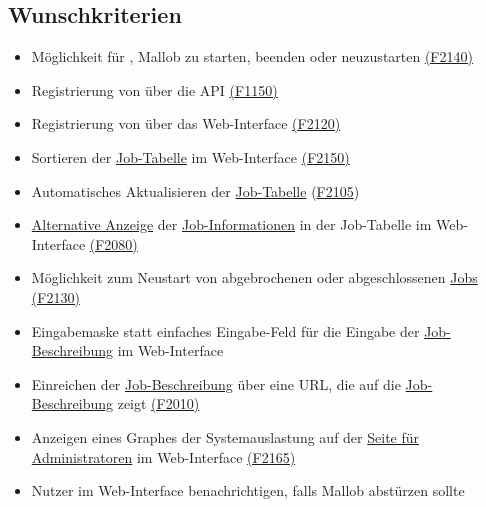         
\subsection{Wunschkriterien}
    \begin{itemize}[noitemsep]
        \item Möglichkeit für , \gls{Mallob} zu starten, beenden oder neuzustarten \hyperref[FA:Web-Interface:Verwalten von Malllob]{(F2140)}
        \item Registrierung von  über die \gls{API} \hyperref[FA:API:Registrierung von Nutzern]{(F1150)}
        \item Registrierung von  über das \gls{Web-Interface} \hyperref[FA:Web-Interface:Registrierung von Nutzern]{(F2120)}
        \item Sortieren der \hyperref[pages:job-table]{Job-Tabelle} im \gls{Web-Interface} \hyperref[FA:Web-Interface:Sortieren der Tabelle]{(F2150)}
        \item Automatisches Aktualisieren der \hyperref[pages:job-table]{Job-Tabelle} (\hyperref[FA:Web-Interface:Aktualisieren]{F2105})
        \item \hyperref[pages:job-table-alt]{Alternative Anzeige} der \hyperref[B:Job-Informationen]{Job-Informationen} in der Job-Tabelle im \gls{Web-Interface} \hyperref[FA:Web-Interface:Einsehen von Job-Informationen]{(F2080)}
        \item Möglichkeit zum Neustart von abgebrochenen oder abgeschlossenen \hyperref[B:Jobs]{Jobs} \hyperref[FA:Web-Interface:Neustart]{(F2130)}
        \item Eingabemaske statt einfaches Eingabe-Feld für die Eingabe der \hyperref[B:Job-Beschreibung]{Job-Beschreibung} im \gls{Web-Interface}
        \item Einreichen der \hyperref[B:Job-Beschreibung]{Job-Beschreibung} über eine \gls{URL}, die auf die \hyperref[B:Job-Beschreibung]{Job-Beschreibung} zeigt \hyperref[FA:Web-Interface:Job einreichen]{(F2010)}
        \item Anzeigen eines Graphes der Systemauslastung auf der \hyperref[pages:admin]{Seite für Administratoren} im \gls{Web-Interface} \hyperref[FA:Web-Interface:Anzeigen von Diagnosedaten]{(F2165)}
        \item \gls{Nutzer} im \gls{Web-Interface} benachrichtigen, falls \gls{Mallob} abstürzen sollte 

\end{itemize}
